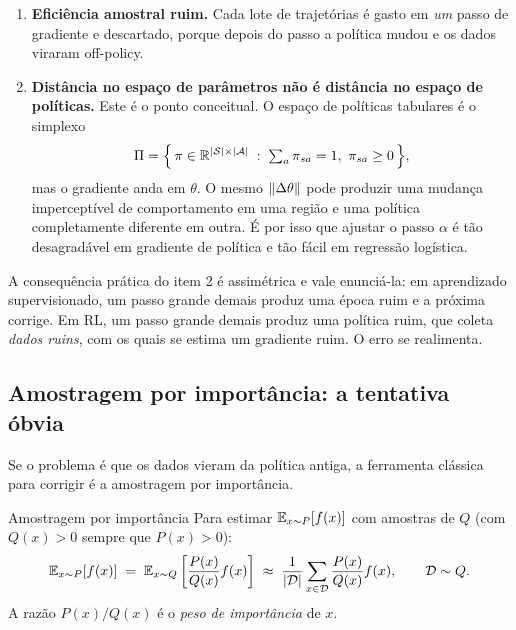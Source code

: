 \documentclass[11pt]{article}
\newcommand{\thv}{\theta}
\newcommand{\Dtot}{\mathcal{D}}
\begin{document}
\begin{enumerate}
  \item \textbf{Eficiência amostral ruim.} Cada lote de trajetórias é gasto em
    \emph{um} passo de gradiente e descartado, porque depois do passo a política mudou e
    os dados viraram off-policy.
  \item \textbf{Distância no espaço de parâmetros não é distância no espaço de
    políticas.} Este é o ponto conceitual. O espaço de políticas tabulares é o simplexo
    \[
      \Pi = \Bigl\{\, \pi \in \mathbb{R}^{\lvert\mathcal{S}\rvert\times\lvert\mathcal{A}\rvert} \;:\;
        \textstyle\sum_a \pi_{sa} = 1,\ \pi_{sa}\ge 0 \,\Bigr\},
    \]
    mas o gradiente anda em $\thv$. O mesmo $\norm{\Delta\thv}$ pode produzir uma
    mudança imperceptível de comportamento em uma região e uma política completamente
    diferente em outra. É por isso que ajustar o passo $\alpha$ é tão desagradável em
    gradiente de política e tão fácil em regressão logística.
\end{enumerate}

\begin{alertabox}
  A consequência prática do item 2 é assimétrica e vale enunciá-la: em aprendizado
  supervisionado, um passo grande demais produz uma época ruim e a próxima corrige. Em
  RL, um passo grande demais produz uma política ruim, que coleta \emph{dados ruins},
  com os quais se estima um gradiente ruim. O erro se realimenta.
\end{alertabox}

\subsection{Amostragem por importância: a tentativa óbvia}

Se o problema é que os dados vieram da política antiga, a ferramenta clássica para
corrigir é a amostragem por importância.

\begin{defbox}{Amostragem por importância}
  Para estimar $\mathbb{E}_{x\sim P}[f(x)]$ com amostras de $Q$ (com $Q(x)>0$ sempre que
  $P(x)>0$):
  \[
    \E_{x\sim P}[f(x)] \;=\; \E_{x\sim Q}\left[\frac{P(x)}{Q(x)}f(x)\right]
      \;\approx\; \frac{1}{\abs{\Dtot}}\sum_{x\in\Dtot}\frac{P(x)}{Q(x)}f(x),
      \qquad \Dtot\sim Q .
  \]
  A razão $P(x)/Q(x)$ é o \emph{peso de importância} de $x$.
\end{defbox}
\end{document}
